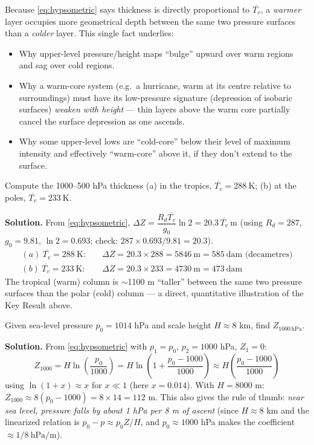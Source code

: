 \documentclass[11pt]{article}
\newcommand{\Rd}{R_d}
\begin{document}
\begin{keyresult}
Because \eqref{eq:hypsometric} says thickness is directly proportional to $\overline{T_v}$, a \emph{warmer} layer occupies more geometrical depth between the same two pressure surfaces than a \emph{colder} layer. This single fact underlies:
\begin{itemize}[leftmargin=1.4em]
\item Why upper-level pressure/height maps ``bulge'' upward over warm regions and sag over cold regions.
\item Why a warm-core system (e.g.\ a hurricane, warm at its centre relative to surroundings) must have its low-pressure signature (depression of isobaric surfaces) \emph{weaken with height} — thin layers above the warm core partially cancel the surface depression as one ascends.
\item Why some upper-level lows are ``cold-core'' below their level of maximum intensity and effectively ``warm-core'' above it, if they don't extend to the surface.
\end{itemize}
\end{keyresult}

\begin{worked}
Compute the 1000--500 hPa thickness (a) in the tropics, $\overline{T_v}=288\ \text{K}$; (b) at the poles, $\overline{T_v}=233\ \text{K}$.

\textbf{Solution.} From \eqref{eq:hypsometric}, $\Delta Z = \dfrac{\Rd \overline{T_v}}{g_0}\ln 2 = 20.3\,\overline{T_v}\ \text{m}$ (using $\Rd=287$, $g_0=9.81$, $\ln 2 = 0.693$; check: $287\times0.693/9.81=20.3$).
\begin{align*}
(a)\ \overline{T_v}=288\ \text{K}: &\quad \Delta Z = 20.3\times288 = 5846\ \text{m} = 585\ \text{dam (decametres)}\\
(b)\ \overline{T_v}=233\ \text{K}: &\quad \Delta Z = 20.3\times233 = 4730\ \text{m} = 473\ \text{dam}
\end{align*}
The tropical (warm) column is $\sim$1100 m ``taller'' between the same two pressure surfaces than the polar (cold) column — a direct, quantitative illustration of the Key Result above.
\end{worked}

\begin{worked}
Given sea-level pressure $p_0=1014$ hPa and scale height $H\approx8$ km, find $Z_{1000\,\text{hPa}}$.

\textbf{Solution.} From \eqref{eq:hypsometric} with $p_1=p_0$, $p_2=1000$ hPa, $Z_1=0$:
\[
Z_{1000} = H\ln\!\left(\frac{p_0}{1000}\right) = H\ln\!\left(1+\frac{p_0-1000}{1000}\right)\approx H\left(\frac{p_0-1000}{1000}\right)
\]
using $\ln(1+x)\approx x$ for $x\ll1$ (here $x=0.014$). With $H=8000$ m: $Z_{1000}\approx 8(p_0-1000) = 8\times14=112$ m.
This also gives the rule of thumb: \emph{near sea level, pressure falls by about 1 hPa per 8 m of ascent} (since $H\approx 8$ km and the linearized relation is $p_0-p \approx p_0 Z/H$, and $p_0\approx1000$ hPa makes the coefficient $\approx1/8\ \text{hPa/m}$).
\end{worked}
\end{document}
